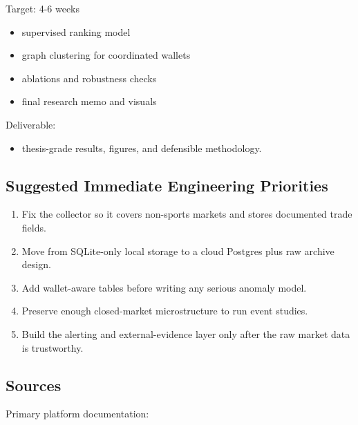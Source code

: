 \documentclass[
]{article}
\providecommand{\tightlist}{%
  \setlength{\itemsep}{0pt}\setlength{\parskip}{0pt}}
\begin{document}
Target: 4-6 weeks

\begin{itemize}
\tightlist
\item
  supervised ranking model
\item
  graph clustering for coordinated wallets
\item
  ablations and robustness checks
\item
  final research memo and visuals
\end{itemize}

Deliverable:

\begin{itemize}
\tightlist
\item
  thesis-grade results, figures, and defensible methodology.
\end{itemize}

\subsection{Suggested Immediate Engineering
Priorities}\label{suggested-immediate-engineering-priorities}

\begin{enumerate}
\def\labelenumi{\arabic{enumi}.}
\tightlist
\item
  Fix the collector so it covers non-sports markets and stores
  documented trade fields.
\item
  Move from SQLite-only local storage to a cloud Postgres plus raw
  archive design.
\item
  Add wallet-aware tables before writing any serious anomaly model.
\item
  Preserve enough closed-market microstructure to run event studies.
\item
  Build the alerting and external-evidence layer only after the raw
  market data is trustworthy.
\end{enumerate}

\subsection{Sources}\label{sources}

Primary platform documentation:
\end{document}
